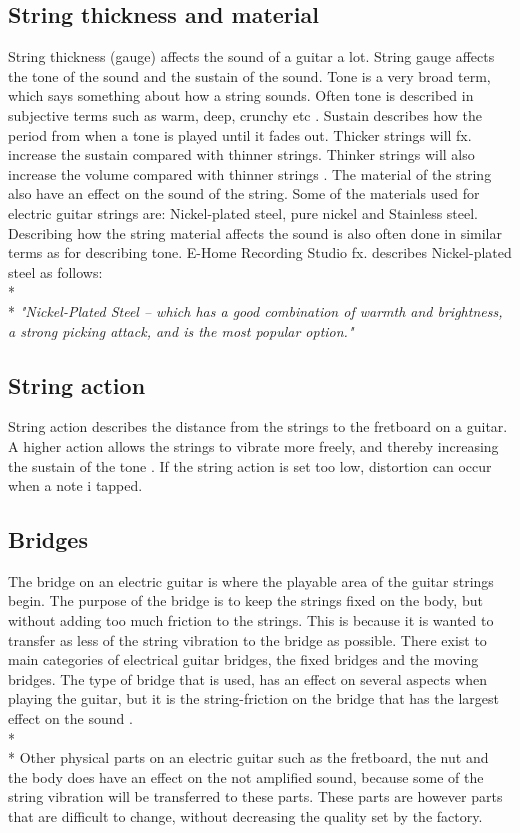 \subsection{String thickness and material}
String thickness (gauge) affects the sound of a guitar a lot. String gauge affects the tone of the sound and the sustain of the sound. Tone is a very broad term, which says something about how a string sounds. Often tone is described in subjective terms such as warm, deep, crunchy etc \cite{premierguitar}. Sustain describes how the period from when a tone is played until it fades out. Thicker strings will fx. increase the sustain compared with thinner strings. Thinker strings will also increase the volume compared with thinner strings \cite{Helsinki}.
The material of the string also have an effect on the sound of the string. Some of the materials used for electric guitar strings are: Nickel-plated steel, pure nickel and Stainless steel. Describing how the string material affects the sound is also often done in similar  terms as for describing tone. E-Home Recording Studio fx. describes Nickel-plated steel as follows:
\\*
\\*
\textit{"Nickel-Plated Steel – which has a good combination of warmth and brightness, a strong picking attack, and is the most popular option."}\cite{E-Home}

\subsection{String action}
String action describes the distance from the strings to the fretboard on a guitar. A higher action allows the strings to vibrate more freely, and thereby increasing the sustain of the tone \cite{sweetwater}. If the string action is set too low, distortion can occur when a note i tapped.  

\subsection{Bridges}
The bridge on an electric guitar is where the playable area of the guitar strings begin. The purpose of the bridge is to keep the strings fixed on the body, but without adding too much friction to the strings. This is because it is wanted to transfer as less of the string vibration to the bridge as possible. There exist to main categories of electrical guitar bridges, the fixed bridges and the moving bridges. The type of bridge that is used, has an effect on several aspects when playing the guitar, but it is the string-friction on the bridge that has the largest effect on the sound \cite{seymourduncan}.
\\*
\\*
Other physical parts on an electric guitar such as the fretboard, the nut and the body does have an effect on the not amplified sound, because some of the string vibration will be transferred to these parts. These parts are however parts that are difficult to change, without decreasing the quality set by the factory.   







